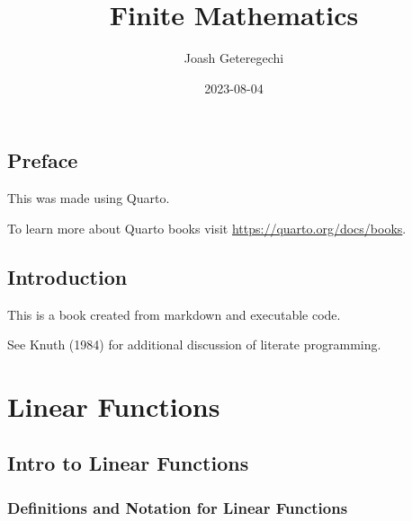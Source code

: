 \documentclass[
  letterpaper,
  DIV=11,
  numbers=noendperiod]{scrreprt}
\title{Finite Mathematics}
\author{Joash Geteregechi}
\date{2023-08-04}
\renewcommand*\contentsname{Table of contents}
\newcommand\contentsname{Table of contents}
\begin{document}
\maketitle
\ifdefined\Shaded\renewenvironment{Shaded}{\begin{tcolorbox}[interior hidden, enhanced, borderline west={3pt}{0pt}{shadecolor}, sharp corners, frame hidden, breakable, boxrule=0pt]}{\end{tcolorbox}}\fi

\renewcommand*\contentsname{Table of contents}
{
\hypersetup{linkcolor=}
\setcounter{tocdepth}{2}
\tableofcontents
}

\hypertarget{preface}{%
\chapter*{Preface}\label{preface}}


This was made using Quarto.

To learn more about Quarto books visit
\url{https://quarto.org/docs/books}.


\hypertarget{introduction}{%
\chapter{Introduction}\label{introduction}}

This is a book created from markdown and executable code.

See Knuth (1984) for additional discussion of literate programming.

\part{Linear Functions}

\hypertarget{intro-to-linear-functions}{%
\chapter{Intro to Linear Functions}\label{intro-to-linear-functions}}

\hypertarget{definitions-and-notation-for-linear-functions}{%
\section{Definitions and Notation for Linear
Functions}\label{definitions-and-notation-for-linear-functions}}
\end{document}

